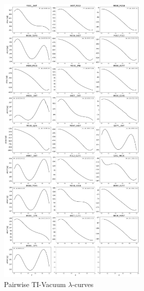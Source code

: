 \begin{figure}
    \centering
    \includegraphics[width=0.65\textwidth]{fig/SI/dG_convergence/TI_vacuum_lambda_curves.png}
    \caption{Pairwise TI-Vacuum $\lambda$-curves}
    \label{SIfig:TI_vacuum_curve}
    \end{figure}

